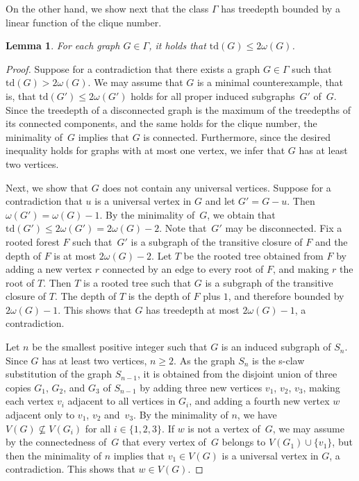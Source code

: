 \documentclass[11pt]{article}
\newcommand{\td}{\mathrm{td}}
\theoremstyle{plain}
\newtheorem{lemma}[theorem]{Lemma}
\theoremstyle{definition}
\theoremstyle{remark}
\numberwithin{equation}{section}
\begin{document}
On the other hand, we show next that the class $\Gamma$ has treedepth bounded by a linear function of the clique number.

\begin{lemma}\label{gamma-td-2omega}
For each graph $G \in \Gamma$, it holds that $\td(G) \leq 2\omega(G)$.
\end{lemma}

\begin{proof}
Suppose for a contradiction that there exists a graph $G\in \Gamma$ such that $\td(G) > 2\omega(G)$.
We may assume that $G$ is a minimal counterexample, that is, that
$\td(G')\le 2\omega(G')$ holds for all proper induced subgraphs~$G'$ of~$G$.
Since the treedepth of a disconnected graph is the maximum of the treedepths of its connected components, and the same holds for the clique number, the minimality of~$G$ implies that $G$ is connected.
Furthermore, since the desired inequality holds for graphs with at most one vertex, we infer that $G$ has at least two vertices.

Next, we show that $G$ does not contain any universal vertices.
Suppose for a contradiction that $u$ is a universal vertex in $G$ and let $G' = G-u$.
Then $\omega(G') = \omega(G)-1$.
By the minimality of~$G$, we obtain that $\td(G')\le 2\omega(G') = 2 \omega(G)-2$.
Note that~$G'$ may be disconnected.
Fix a rooted forest $F$ such that~$G'$ is a subgraph of the transitive closure of $F$ and the depth of $F$ is at most $2\omega(G)-2$.
Let $T$ be the rooted tree obtained from $F$ by adding a new vertex $r$ connected by an edge to every root of $F$, and making $r$ the root of $T$.
Then $T$ is a rooted tree such that $G$ is a subgraph of the transitive closure of $T$.
The depth of $T$ is the depth of $F$ plus $1$, and therefore bounded by $2\omega(G)-1$.
This shows that $G$ has treedepth at most $2\omega(G)-1$, a contradiction.

Let $n$ be the smallest positive integer such that $G$ is an induced subgraph of $S_n$.
Since $G$ has at least two vertices, $n\ge 2$.
As the graph $S_{n}$ is the s-claw substitution of the graph $S_{n-1}$, it is obtained from the disjoint union of three copies $G_1$, $G_2$, and $G_3$ of $S_{n-1}$ by adding three new vertices $v_1$, $v_2$, $v_3$, making each vertex $v_i$ adjacent to all vertices in $G_i$, and adding a fourth new vertex $w$ adjacent only to $v_1$, $v_2$ and~$v_3$.
By the minimality of $n$, we have $V(G)\not\subseteq V(G_i)$ for all $i\in \{1,2,3\}$.
If $w$ is not a vertex of~$G$, we may assume by the connectedness of~$G$ that every vertex of~$G$ belongs to $V(G_1)\cup \{v_1\}$, but then the minimality of $n$ implies that $v_1\in V(G)$ is a universal vertex in $G$, a contradiction.
This shows that $w\in V(G)$.


\end{proof}
\end{document}
